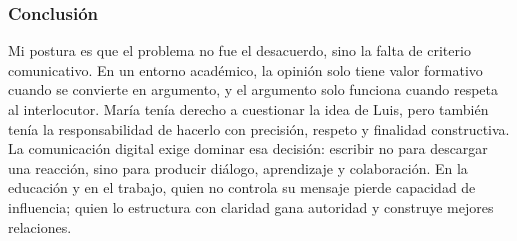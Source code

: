 \subsubsection{Conclusión}

Mi postura es que el problema no fue el desacuerdo, sino la falta de criterio comunicativo. En un entorno académico, la opinión solo tiene valor formativo cuando se convierte en argumento, y el argumento solo funciona cuando respeta al interlocutor. María tenía derecho a cuestionar la idea de Luis, pero también tenía la responsabilidad de hacerlo con precisión, respeto y finalidad constructiva. La comunicación digital exige dominar esa decisión: escribir no para descargar una reacción, sino para producir diálogo, aprendizaje y colaboración. En la educación y en el trabajo, quien no controla su mensaje pierde capacidad de influencia; quien lo estructura con claridad gana autoridad y construye mejores relaciones.

